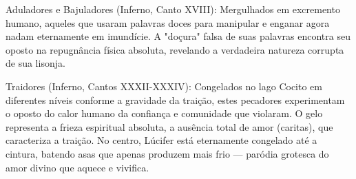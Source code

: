 Aduladores e Bajuladores (Inferno, Canto XVIII): Mergulhados em excremento humano, aqueles que usaram palavras doces para manipular e enganar agora nadam eternamente em imundície. A "doçura" falsa de suas palavras encontra seu oposto na repugnância física absoluta, revelando a verdadeira natureza corrupta de sua lisonja.

Traidores (Inferno, Cantos XXXII-XXXIV): Congelados no lago Cocito em diferentes níveis conforme a gravidade da traição, estes pecadores experimentam o oposto do calor humano da confiança e comunidade que violaram. O gelo representa a frieza espiritual absoluta, a ausência total de amor (caritas), que caracteriza a traição. No centro, Lúcifer está eternamente congelado até a cintura, batendo asas que apenas produzem mais frio --- paródia grotesca do amor divino que aquece e vivifica.

